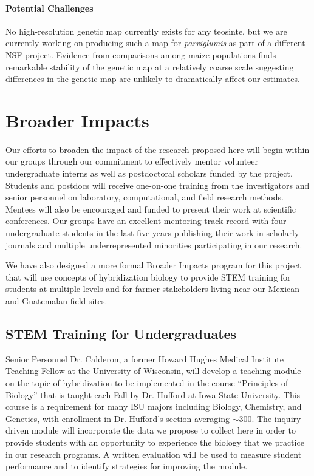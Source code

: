 \paragraph{Potential Challenges} 
No high-resolution genetic map currently exists for any teosinte, but we are currently working on producing such a map for \emph{parviglumis} as part of a different NSF project.
Evidence from comparisons among maize populations finds remarkable stability of the genetic map at a relatively coarse scale \citep{rodgers2015recombination} suggesting differences in the genetic map are unlikely to dramatically affect our estimates. 

\section*{Broader Impacts}
Our efforts to broaden the impact of the research proposed here will begin within our groups through our commitment to effectively mentor volunteer undergraduate interns as well as postdoctoral scholars funded by the project. Students and postdocs will receive one-on-one training from the investigators and senior personnel on laboratory, computational, and field research methods.  Mentees will also be encouraged and funded to present their work at scientific conferences.  Our groups have an excellent mentoring track record with four undergraduate students in the last five years publishing their work in scholarly journals and multiple underrepresented minorities participating in our research.

We have also designed a more formal Broader Impacts program for this project that will use concepts of hybridization biology to provide STEM training for students at multiple levels and for farmer stakeholders living near our Mexican and Guatemalan field sites.

\subsection*{STEM Training for Undergraduates}
Senior Personnel Dr. Calderon, a former Howard Hughes Medical Institute Teaching Fellow at the University of Wisconsin, will develop a teaching module on the topic of hybridization to be implemented in the course ``Principles of Biology'' that is taught each Fall by Dr. Hufford at Iowa State University.
This course is a requirement for many ISU majors including Biology, Chemistry, and Genetics, with enrollment in Dr. Hufford's section averaging $\sim$300.
The inquiry-driven module will incorporate the data we propose to collect here in order to provide students with an opportunity to experience the biology that we practice in our research programs.
A written evaluation will be used to measure student performance and to identify strategies for improving the module.

